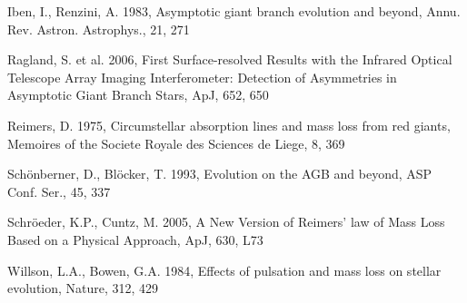 \documentclass[a4paper,11pt,twocolumn]{article}
\begin{document}
\begin{thebibliography}{9}
    Iben, I., Renzini, A. 1983, Asymptotic giant branch evolution and beyond, Annu. Rev. Astron. Astrophys., 21, 271

    Ragland, S. et al. 2006, First Surface-resolved Results with the Infrared Optical Telescope Array Imaging Interferometer: Detection of Asymmetries in Asymptotic Giant Branch Stars, ApJ, 652, 650



    Reimers, D. 1975, Circumstellar absorption lines and mass loss from red giants, Memoires of the Societe Royale des Sciences de Liege, 8, 369
    
    Schönberner, D., Blöcker, T. 1993, Evolution on the AGB and beyond, ASP Conf. Ser., 45, 337


    Schröeder, K.P., Cuntz, M. 2005, A New Version of Reimers’ law of Mass Loss Based on a Physical Approach, ApJ, 630, L73


    Willson, L.A., Bowen, G.A. 1984, Effects of pulsation and mass loss on stellar evolution, Nature, 312, 429




\end{thebibliography}
\end{document}
